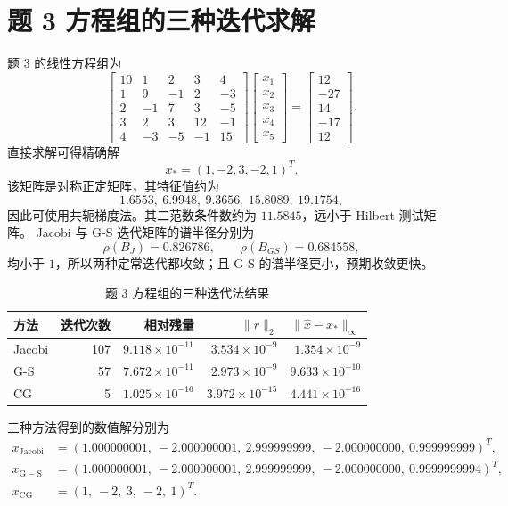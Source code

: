 \documentclass[a4paper,11pt]{article}
\begin{document}
\section{题 3 方程组的三种迭代求解}
题 3 的线性方程组为
\[
\begin{bmatrix}
10&1&2&3&4\\
1&9&-1&2&-3\\
2&-1&7&3&-5\\
3&2&3&12&-1\\
4&-3&-5&-1&15
\end{bmatrix}
\begin{bmatrix}x_1\\x_2\\x_3\\x_4\\x_5\end{bmatrix}
=
\begin{bmatrix}12\\-27\\14\\-17\\12\end{bmatrix}.
\]
直接求解可得精确解
\[
    x_\ast=(1,-2,3,-2,1)^T.
\]
该矩阵是对称正定矩阵，其特征值约为
\[
    1.6553,\ 6.9948,\ 9.3656,\ 15.8089,\ 19.1754,
\]
因此可使用共轭梯度法。其二范数条件数约为 $11.5845$，远小于 Hilbert 测试矩阵。
Jacobi 与 G-S 迭代矩阵的谱半径分别为
\[
    \rho(B_J)=0.826786,\qquad \rho(B_{GS})=0.684558,
\]
均小于 $1$，所以两种定常迭代都收敛；且 G-S 的谱半径更小，预期收敛更快。

\begin{table}[H]
\centering
\small
\caption{题 3 方程组的三种迭代法结果}
\label{tab:problem3}
\begin{tabular}{lrrrr}
\toprule
方法 & 迭代次数 & 相对残量 & $\|r\|_2$ & $\|\hat x-x_\ast\|_\infty$ \\
\midrule
Jacobi & 107 & $9.118\times10^{-11}$ & $3.534\times10^{-9}$  & $1.354\times10^{-9}$ \\
G-S    & 57  & $7.672\times10^{-11}$ & $2.973\times10^{-9}$  & $9.633\times10^{-10}$ \\
CG     & 5   & $1.025\times10^{-16}$ & $3.972\times10^{-15}$ & $4.441\times10^{-16}$ \\
\bottomrule
\end{tabular}
\end{table}

三种方法得到的数值解分别为
\[
\begin{aligned}
x_{\mathrm{Jacobi}}&=(1.000000001,\ -2.000000001,\ 2.999999999,\ -2.000000000,\ 0.999999999)^T,\\
x_{\mathrm{G-S}}&=(1.000000001,\ -2.000000001,\ 2.999999999,\ -2.000000000,\ 0.9999999994)^T,\\
x_{\mathrm{CG}}&=(1,\ -2,\ 3,\ -2,\ 1)^T.
\end{aligned}
\]
\end{document}
